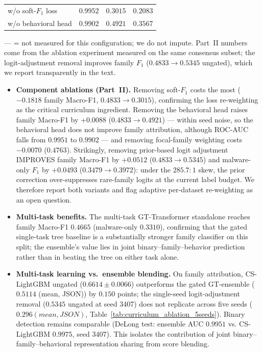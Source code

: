 \documentclass[Number]{sn-jnl}
\begin{document}
\begin{table}[htbp]
{\begin{tabular}{lccc}
w/o soft-$F_1$ loss                     & $0.9952$ & $0.3015$ & $0.2083$ \\
w/o behavioral head                     & $0.9902$ & $0.4921$ & $0.3567$ \\
\bottomrule
\end{tabular}}
\par\vspace{2pt}\raggedright\scriptsize
--- = not measured for this configuration; we do not impute. Part~II numbers come from the ablation experiment measured on the same consensus subset; the logit-adjustment removal improves family $F_1$ ($0.4833\!\to\!0.5345$ ungated), which we report transparently in the text.
\end{table}

\begin{itemize}[leftmargin=*]
\item \textbf{Component ablations (Part~II).}
Removing soft-$F_1$ costs the most ($-0.1818$ family Macro-F1, $0.4833\!\to\!0.3015$), confirming the loss re-weighting as the critical curriculum ingredient. Removing the behavioral head raises family Macro-F1 by $+0.0088$ ($0.4833\!\to\!0.4921$) --- within seed noise, so the behavioral head does not improve family attribution, although ROC-AUC falls from $0.9951$ to $0.9902$ --- and removing focal-family weighting costs $-0.0070$ ($0.4763$). Strikingly, removing prior-based logit adjustment IMPROVES family Macro-F1 by $+0.0512$ ($0.4833\!\to\!0.5345$) and malware-only $F_1$ by $+0.0493$ ($0.3479\!\to\!0.3972$): under the $285.7{:}1$ skew, the prior correction over-suppresses rare-family logits at the current label budget. We therefore report both variants and flag adaptive per-dataset re-weighting as an open question.

\item \textbf{Multi-task benefits.}
The multi-task GT-Transformer standalone reaches family Macro-F1 $0.4665$ (malware-only $0.3310$), confirming that the gated single-task tree baseline is a substantially stronger family classifier on this split; the ensemble's value lies in joint binary--family--behavior prediction rather than in beating the tree on either task alone.

\item \textbf{Multi-task learning vs.\ ensemble blending.}
On family attribution, CS-LightGBM ungated ($0.6614\pm0.0066$) outperforms the gated GT-ensemble ($0.5114$ (mean, JSON)) by $0.150$ points; the single-seed logit-adjustment removal ($0.5345$ ungated at seed 3407) does not replicate across five seeds ($0.296 (mean, JSON)$, Table~\ref{tab:curriculum_ablation_5seeds}). Binary detection remains comparable (DeLong test: ensemble AUC $0.9951$ vs. CS-LightGBM $0.9975$, seed 3407). This isolates the contribution of joint binary--family--behavioral representation sharing from score blending.


\end{itemize}
\end{document}
